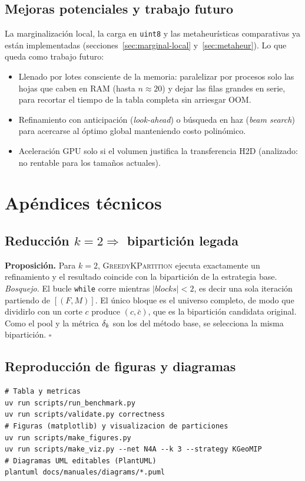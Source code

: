 \documentclass[11pt,letterpaper]{article}
\begin{document}
\subsection{Mejoras potenciales y trabajo futuro}
La marginalización local, la carga en \texttt{uint8} y las metaheurísticas
comparativas ya están implementadas (secciones~\ref{sec:marginal-local}
y~\ref{sec:metaheur}). Lo que queda como trabajo futuro:
\begin{itemize}
	\item Llenado por lotes consciente de la memoria: paralelizar por procesos solo
	      las hojas que caben en RAM (hasta $n\approx 20$) y dejar las filas grandes en
	      serie, para recortar el tiempo de la tabla completa sin arriesgar OOM.
	\item Refinamiento con anticipación (\emph{look-ahead}) o búsqueda en haz
	      (\emph{beam search}) para acercarse al
	      óptimo global manteniendo costo polinómico.
	\item Aceleración GPU solo si el volumen justifica la transferencia H2D
	      (analizado: no rentable para los tamaños actuales).
\end{itemize}

\section{Apéndices técnicos}

\subsection{Reducción $k=2 \Rightarrow$ bipartición legada}
\textbf{Proposición.} Para $k=2$, \textsc{GreedyKPartition} ejecuta exactamente un
refinamiento y el resultado coincide con la bipartición de la estrategia base.\\
\emph{Bosquejo.} El bucle \texttt{while} corre mientras $|\mathit{blocks}|<2$, es
decir una sola iteración partiendo de $[(F,M)]$. El único bloque es el universo
completo, de modo que dividirlo con un corte $c$ produce $(c,\bar c)$, que es la
bipartición candidata original. Como el pool y la métrica $\delta_k$ son los del método
base, se selecciona la misma bipartición. $\square$

\subsection{Reproducción de figuras y diagramas}
\begin{lstlisting}[style=sh,caption={Comandos de reproducción.}]
# Tabla y metricas
uv run scripts/run_benchmark.py
uv run scripts/validate.py correctness
# Figuras (matplotlib) y visualizacion de particiones
uv run scripts/make_figures.py
uv run scripts/make_viz.py --net N4A --k 3 --strategy KGeoMIP
# Diagramas UML editables (PlantUML)
plantuml docs/manuales/diagrams/*.puml
\end{lstlisting}
\end{document}
